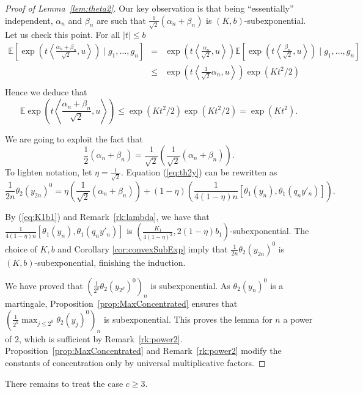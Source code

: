 \documentclass[11pt,leqno]{article}
\theoremstyle{plain}
\theoremstyle{definition}
\theoremstyle{remark}
\numberwithin{equation}{section}
\newcommand{\E}{\mathbb{E}}
\begin{document}
\begin{proof}[Proof of Lemma~\ref{lem:theta2}]
Our key observation is that being ``essentially'' independent, $\alpha_n$ and $\beta_n$ are such that 
$\frac{1}{\sqrt{2}}(\alpha_n+\beta_n)$ is $(K,b)$-subexponential. 
Let us check this point. For all $|t|\leq b$
\begin{eqnarray*}
\E\left[\exp\left(t\left\langle\frac{\alpha_n+\beta_n}{\sqrt{2}},u\right\rangle\right) \mid g_1,\dots,g_n\right]& = & \exp\left(t\left\langle\frac{\alpha_{n}}{\sqrt{2}},u\right\rangle\right) \E\left[\exp\left(t\left\langle\frac{\beta_{n}}{\sqrt{2}},u\right\rangle\right) \mid g_1,\dots,g_n\right]\\
                                                            & \leq &  \exp\left(t\left\langle\frac{1}{\sqrt{2}}\alpha_{n},u\right\rangle\right)\exp(Kt^2/2)\\
\end{eqnarray*}
Hence we deduce that 
\[\E\exp\left(t\left\langle\frac{\alpha_n+\beta_n}{\sqrt{2}},u\right\rangle\right)\leq \exp(Kt^2/2)\exp(Kt^2/2)=\exp(Kt^2).\]

We are going to exploit the fact that 
\[
\frac{1}{2}(\alpha_n+\beta_n)=\frac{1}{\sqrt{2}}\left(\frac{1}{\sqrt{2}}(\alpha_n+\beta_n)\right).
\]
To lighten notation, let $\eta=\frac{1}{\sqrt{2}}$. Equation (\ref{eq:th2y}) can be rewritten as
 \[
 \frac{1}{2n}\theta_2(y_{2n})^0= \eta\left(\frac{1}{\sqrt{2}}(\alpha_n+\beta_n)\right)+(1-\eta)\left(\frac{1}{4(1-\eta)n}\left[\theta_1({y}_{n}),\theta_1(q_{n}y'_n)\right]\right).
 \]
 
By (\ref{eq:K1b1}) and Remark~\ref{rk:lambda}, we have that $\frac{1}{4(1-\eta)n}\left[\theta_1({y}_{n}),\theta_1(q_{n}y'_n)\right]$ is $(\frac{K_1}{4(1-\eta)^2},2(1-\eta)b_1)$-subexponential. The choice of $K,b$ and Corollary \ref{cor:convexSubExp} imply that $\frac{1}{2n}\theta_2(y_{2n})^0$ is $(K,b)$-subexponential, finishing the induction.

We have proved that $\left(\frac{1}{2^k}\theta_2(y_{2^k})^0\right)_n$ is subexponential. As $\theta_2(y_n)^0$ is a martingale, Proposition~\ref{prop:MaxConcentrated} ensures that $\left(\frac{1}{2^k}\max_{j\le 2^k}\theta_2(y_j)^0\right)_n$ is subexponential. This proves the lemma for $n$ a power of $2$, which is sufficient by Remark~\ref{rk:power2}. Proposition~\ref{prop:MaxConcentrated} and Remark~\ref{rk:power2} modify the constants of concentration only by universal multiplicative factors.
\end{proof}



There remains to treat the case $c\ge 3$.
\end{document}
